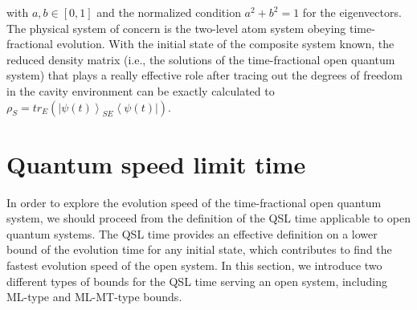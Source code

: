 \documentclass[
showpacs,  %
showkeys,  %
aps,       %
amsthm,    %
amsmath,   %
amsfonts,  %
amssymb    %
]{revtex4-1}          %
\begin{document}
with $a,b\in[0,1]$ and the normalized condition $a^2+b^2=1$ for the eigenvectors. The physical system of concern is the two-level atom system obeying time-fractional evolution. With the initial state of the composite system known, the reduced density matrix (i.e., the solutions of the time-fractional open quantum system) that plays a really effective role after tracing out the degrees of freedom in the cavity environment can be exactly calculated to ${\rho _S} = t{r_E}({\left| {\psi (t)} \right\rangle _{SE}}\left\langle {\psi (t)} \right|)$.



\section{Quantum speed limit time}
\label{Sec:3}
In order to explore the evolution speed of the time-fractional open quantum system, we should proceed from the definition of the QSL time applicable to open quantum systems. The QSL time provides an effective definition on a lower bound of the evolution time for any initial state, which contributes to find the fastest evolution speed of the open system. In this section, we introduce two different types of bounds for the QSL time serving an open system, including ML-type and ML-MT-type bounds.
\end{document}
